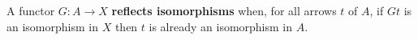 A functor $G: A \to X$ \textbf{reflects isomorphisms} when, for all arrows $t$ of $A$, if $Gt$ is an isomorphism in $X$ then $t$ is already an isomorphism in $A$.
